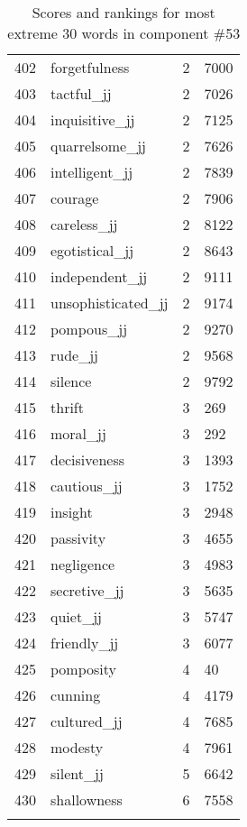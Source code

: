 \begin{longtable}[!htbp]{| rlr@{.}l |}
    402 & forgetfulness & 2 & 7000 \\
    403 & tactful\_jj & 2 & 7026 \\
    404 & inquisitive\_jj & 2 & 7125 \\
    405 & quarrelsome\_jj & 2 & 7626 \\
    406 & intelligent\_jj & 2 & 7839 \\
    407 & courage & 2 & 7906 \\
    408 & careless\_jj & 2 & 8122 \\
    409 & egotistical\_jj & 2 & 8643 \\
    410 & independent\_jj & 2 & 9111 \\
    411 & unsophisticated\_jj & 2 & 9174 \\
    412 & pompous\_jj & 2 & 9270 \\
    413 & rude\_jj & 2 & 9568 \\
    414 & silence & 2 & 9792 \\
    415 & thrift & 3 & 269 \\
    416 & moral\_jj & 3 & 292 \\
    417 & decisiveness & 3 & 1393 \\
    418 & cautious\_jj & 3 & 1752 \\
    419 & insight & 3 & 2948 \\
    420 & passivity & 3 & 4655 \\
    421 & negligence & 3 & 4983 \\
    422 & secretive\_jj & 3 & 5635 \\
    423 & quiet\_jj & 3 & 5747 \\
    424 & friendly\_jj & 3 & 6077 \\
    425 & pomposity & 4 & 40 \\
    426 & cunning & 4 & 4179 \\
    427 & cultured\_jj & 4 & 7685 \\
    428 & modesty & 4 & 7961 \\
    429 & silent\_jj & 5 & 6642 \\
    430 & shallowness & 6 & 7558 \\
    \hline
    \caption{Scores and rankings for most extreme 30 words in component \#53} \\
\end{longtable}
